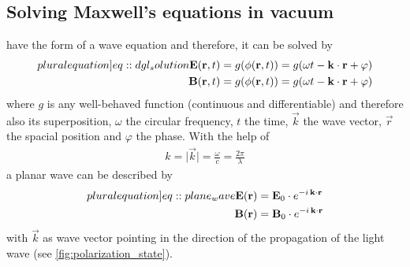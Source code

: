 \subsection{Solving Maxwell's equations in vacuum}\label{sec::SolvMaxEqVac}
%
 have the form of a wave equation and therefore, it can be solved by
%
\begin{align}
\begin{split} \label[pluralequation]{eq::dgl_solution}
  \vec{E}( \vec{r}, t ) &= g(\phi( \vec{r}, t )) = g( \omega t - \vec{k} \cdot \vec{r} + \varphi)\\
  \vec{B}( \vec{r}, t ) &= g(\phi( \vec{r}, t )) = g( \omega t - \vec{k} \cdot \vec{r} + \varphi )
\end{split}
\end{align}
%
where $g$ is any well-behaved function (continuous and differentiable) and therefore also its superposition, $\omega$ the circular frequency, $t$ the time, $\vec{k}$ the wave vector, $\vec{r}$ the spacial position and $\varphi$ the phase.
%
With the help of
%
\begin{align}
k = \mathopen| \vec{k} \mathclose| = \frac{\omega}{c} =  \frac{2 \pi}{\lambda}
\end{align}
%
a planar wave can be described by
%
\begin{align}
\begin{split} \label[pluralequation]{eq::plane_wave}
\vec{E}(\vec{r}) &= \vec{E}_0 \cdot e^{ -i \, \vec{k} \cdot \vec{r} }\\
 \vec{B}(\vec{r}) &= \vec{B}_0 \cdot e^{ -i \, \vec{k} \cdot \vec{r} }
\end{split}
\end{align}
%
with $\vec{k}$ as wave vector pointing in the direction of the propagation of the light wave (see \cref{fig:polarization_state}).
%
%
